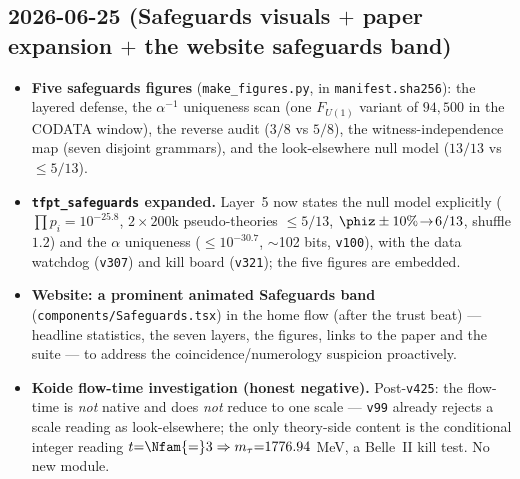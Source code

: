 \documentclass[11pt]{article}
\providecommand{\vref}[1]{\texttt{#1}}
\begin{document}
\subsection*{2026-06-25 (Safeguards visuals $+$ paper expansion $+$ the website safeguards band)}
\begin{itemize}
\item \textbf{Five safeguards figures} (\texttt{make\_figures.py}, in \texttt{manifest.sha256}): the
layered defense, the $\alpha^{-1}$ uniqueness scan (one $F_{U(1)}$ variant of $94{,}500$ in the CODATA
window), the reverse audit ($3/8$ vs $5/8$), the witness-independence map (seven disjoint grammars), and the
look-elsewhere null model ($13/13$ vs $\le5/13$).
\item \textbf{\texttt{tfpt\_safeguards} expanded.} Layer~5 now states the null model explicitly
($\prod p_i{=}10^{-25.8}$, $2{\times}200$k pseudo-theories $\le5/13$, $\phiz\pm10\%\!\to\!6/13$, shuffle
$1.2$) and the $\alpha$ uniqueness ($\le10^{-30.7}$, $\sim$102 bits, \vref{v100}), with the data watchdog
(\vref{v307}) and kill board (\vref{v321}); the five figures are embedded.
\item \textbf{Website: a prominent animated Safeguards band} (\texttt{components/Safeguards.tsx}) in the
home flow (after the trust beat) --- headline statistics, the seven layers, the figures, links to the paper
and the suite --- to address the coincidence/numerology suspicion proactively.
\item \textbf{Koide flow-time investigation (honest negative).} Post-\texttt{v425}: the flow-time is
\emph{not} native and does \emph{not} reduce to one scale --- \vref{v99} already rejects a scale reading as
look-elsewhere; the only theory-side content is the conditional integer reading $t{=}\Nfam{=}3\Rightarrow
m_\tau{=}1776.94$ MeV, a Belle~II kill test. No new module.
\end{itemize}
\end{document}
